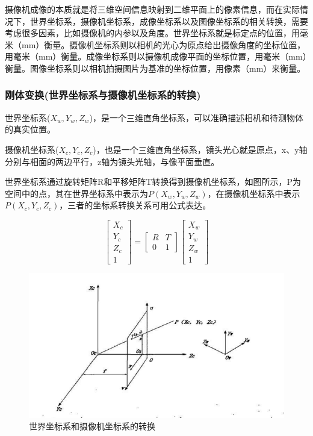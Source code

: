 摄像机成像的本质就是将三维空间信息映射到二维平面上的像素信息，而在实际情况下，世界坐标系，摄像机坐标系，成像坐标系以及图像坐标系的相关转换，需要考虑很多因素，比如摄像机的内参以及角度。世界坐标系就是标定点的位置，用毫米（mm）衡量。摄像机坐标系则以相机的光心为原点给出摄像角度的坐标位置，用毫米（mm）衡量。成像坐标系则以摄像机成像平面的坐标位置，用毫米（mm）衡量。图像坐标系则以相机拍摄图片为基准的坐标位置，用像素（mm）来衡量。

\subsubsection{刚体变换(世界坐标系与摄像机坐标系的转换)}

世界坐标系($X_w,Y_w,Z_w$)，是一个三维直角坐标系，可以准确描述相机和待测物体的真实位置。

摄像机坐标系($X_c,Y_c,Z_c$)，也是一个三维直角坐标系，镜头光心就是原点，x、y轴分别与相面的两边平行，z轴为镜头光轴，与像平面垂直。

世界坐标系通过旋转矩阵R和平移矩阵T转换得到摄像机坐标系，如图所示，P为空间中的点，其在世界坐标系中表示为$
P\left( {{X_w},{Y_w},{Z_w}} \right)$，在摄像机坐标系中表示$
P\left( {{X_c},{Y_c},{Z_c}} \right)$，三者的坐标系转换关系可用公式表达。

\begin{equation}
\left[ {\begin{array}{*{20}{c}}
{{X_c}}\\
{{Y_c}}\\
{{Z_c}}\\
1
\end{array}} \right] = \left[ {\begin{array}{*{20}{c}}
R&T\\
0&1
\end{array}} \right]\left[ {\begin{array}{*{20}{c}}
{{X_w}}\\
{{Y_w}}\\
{{Z_w}}\\
1
\end{array}} \right]
\end{equation}

\begin{figure}[h]
	\includegraphics{pic/para_1.png}
	\caption{世界坐标系和摄像机坐标系的转换}
	\label{para_1}
\end{figure}

